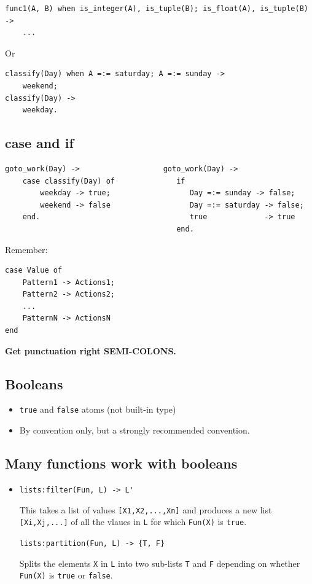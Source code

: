 \documentclass[12pt]{article}
\begin{document}
\begin{verbatim}
func1(A, B) when is_integer(A), is_tuple(B); is_float(A), is_tuple(B) ->
    ...
\end{verbatim}

Or

\begin{verbatim}
classify(Day) when A =:= saturday; A =:= sunday ->
    weekend;
classify(Day) ->
    weekday.
\end{verbatim}

\subsection{case and if}

\begin{verbatim}
goto_work(Day) ->                   goto_work(Day) ->
    case classify(Day) of              if
        weekday -> true;                  Day =:= sunday -> false;
        weekend -> false                  Day =:= saturday -> false;
    end.                                  true             -> true
                                       end.
\end{verbatim}

Remember:

\begin{verbatim}
case Value of
    Pattern1 -> Actions1;
    Pattern2 -> Actions2;
    ...
    PatternN -> ActionsN
end
\end{verbatim}

{\bf Get punctuation right SEMI-COLONS.}


\subsection{Booleans}

\begin{itemize}
\item \verb+true+ and \verb+false+ atoms (not built-in type)
\item By convention only, but a strongly recommended convention.
\end{itemize}


\subsection{Many functions work with booleans}

\begin{itemize}
\item \verb+lists:filter(Fun, L) -> L'+


This takes a list of values \verb+[X1,X2,...,Xn]+ and produces a new
list \verb+[Xi,Xj,...]+ of all the vlaues in \verb+L+ for which \verb+Fun(X)+ is
\verb+true+.

\verb+lists:partition(Fun, L) -> {T, F}+

Splits the elements \verb+X+ in \verb+L+ into two sub-lists \verb+T+
and \verb+F+ depending on whether \verb+Fun(X)+ is \verb+true+ or
\verb+false+.
\end{itemize}
\end{document}
